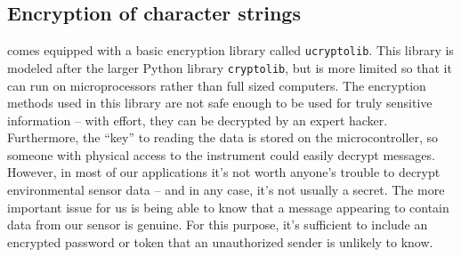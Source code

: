 \subsection{Encryption of character strings}
\Micropython comes equipped with a basic encryption library called \lstinline{ucryptolib}.
This library is modeled after the larger  Python library \lstinline{cryptolib}, but is more limited so that it can run on microprocessors rather than full sized computers. 
The encryption methods used in this library are not safe enough to be used for truly sensitive information -- with effort, they can be decrypted by an expert hacker.
Furthermore, the ``key'' to reading the data is stored on the microcontroller, so someone with physical access to the instrument could easily decrypt messages.
However, in most of our applications it's not worth anyone's trouble to decrypt environmental sensor data -- and in any case, it's not usually a secret.
The more important issue for us is being able to know that a message appearing to contain data from our sensor is genuine.
For this purpose, it's sufficient to include an encrypted password or token that an unauthorized sender is unlikely to know.

